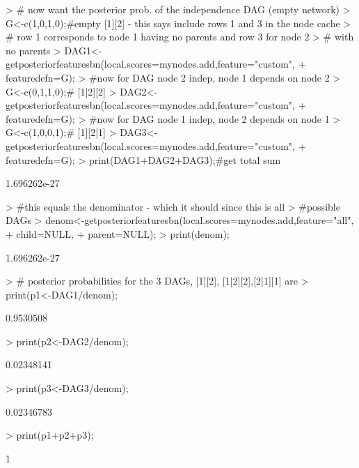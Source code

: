 \documentclass[nojss]{jss}
\begin{document}
\begin{Schunk}
\begin{Sinput}
> # now want the posterior prob. of the independence DAG (empty network)
> G<-c(1,0,1,0);#empty [1][2] - this says include rows 1 and 3 in the node cache
> # row 1 corresponds to node 1 having no parents and row 3 for node 2
> # with no parents
> DAG1<-getposteriorfeaturesbn(local.scores=mynodes.add,feature="custom",
+                              featuredefn=G);
> #now for DAG node 2 indep, node 1 depends on node 2
> G<-c(0,1,1,0);# [1|2][2]
> DAG2<-getposteriorfeaturesbn(local.scores=mynodes.add,feature="custom",
+                              featuredefn=G);
> #now for DAG node 1 indep, node 2 depends on node 1
> G<-c(1,0,0,1);# [1][2|1]
> DAG3<-getposteriorfeaturesbn(local.scores=mynodes.add,feature="custom",
+                              featuredefn=G);
> print(DAG1+DAG2+DAG3);#get total sum
\end{Sinput}
\begin{Soutput}
[1] 1.696262e-27
\end{Soutput}
\begin{Sinput}
> #this equals the denominator - which it should since this is all 
> #possible DAGs
> denom<-getposteriorfeaturesbn(local.scores=mynodes.add,feature="all",
+        child=NULL,
+        parent=NULL);
> print(denom);
\end{Sinput}
\begin{Soutput}
[1] 1.696262e-27
\end{Soutput}
\begin{Sinput}
> # posterior probabilities for the 3 DAGs, [1][2], [1|2][2],[2|1][1] are
> print(p1<-DAG1/denom);
\end{Sinput}
\begin{Soutput}
[1] 0.9530508
\end{Soutput}
\begin{Sinput}
> print(p2<-DAG2/denom);
\end{Sinput}
\begin{Soutput}
[1] 0.02348141
\end{Soutput}
\begin{Sinput}
> print(p3<-DAG3/denom);
\end{Sinput}
\begin{Soutput}
[1] 0.02346783
\end{Soutput}
\begin{Sinput}
> print(p1+p2+p3);
\end{Sinput}
\begin{Soutput}
[1] 1
\end{Soutput}
\end{Schunk}
\end{document}

